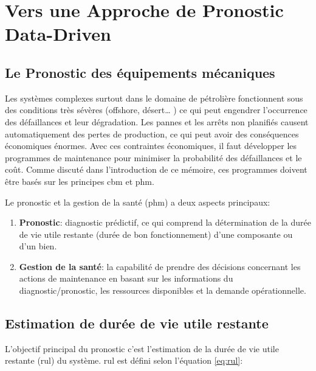 \chapter{Vers une Approche de Pronostic Data-Driven}


\section{Le Pronostic des équipements mécaniques}
Les systèmes complexes surtout dans le domaine de pétrolière fonctionnent sous des conditions très sévères (offshore, désert… ) ce qui peut engendrer l’occurrence des défaillances et leur dégradation. Les pannes et les arrêts non planifiés causent automatiquement des pertes de production, ce qui peut avoir des conséquences économiques énormes. Avec ces contraintes économiques, il faut développer les programmes de maintenance pour minimiser la probabilité des défaillances et le coût. Comme discuté dans l'introduction de ce mémoire, ces programmes doivent être basés sur les principes \acrlong{cbm} et \acrlong{phm}.

Le pronostic et la gestion de la santé (\acrlong{phm}) a deux aspects principaux\cite{Hess2008}:

\begin{enumerate}
    \item \textbf{Pronostic}: diagnostic prédictif, ce qui comprend la détermination de la durée de vie utile restante (durée de bon fonctionnement) d'une composante ou d'un bien.
    \item \textbf{Gestion de la santé}: la capabilité de prendre des décisions concernant les actions de maintenance en basant sur les informations du diagnostic/pronostic, les ressources disponibles et la demande opérationnelle.
\end{enumerate}

\section{Estimation de durée de vie utile restante}
L'objectif principal du pronostic c'est l'estimation de la durée de vie utile restante (\acrlong{rul}) du système.
\acrshort{rul} est défini selon l'équation \ref{eq:rul}:

